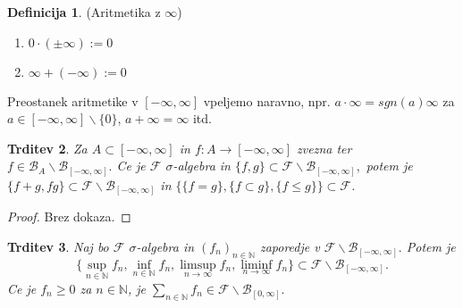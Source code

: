 \documentclass[a4paper,12pt]{article}
\theoremstyle{definition} %
\newtheorem{definicija}{Definicija}[section]
\theoremstyle{plain} %
\newtheorem{trditev}[definicija]{Trditev}
\newcommand{\N}{\mathbb{N}}
\newcommand{\F}{\mathcal{F}}
\begin{document}
            \begin{definicija} (Aritmetika z $\infty$)
                 \begin{enumerate}
                    \item $0\cdot (\pm\infty) := 0$
                    \item $\infty + (-\infty) := 0$
                 \end{enumerate}
                 Preostanek aritmetike v $[-\infty, \infty]$ vpeljemo naravno, npr. $a \cdot \infty = sgn(a)\infty$ za $a \in [-\infty, \infty]\backslash\{0\}$, $a + \infty = \infty$ itd.
            \end{definicija}

            \begin{trditev}
                Za $A \subset [-\infty, \infty]$ in $f:A \rightarrow [-\infty, \infty]$ zvezna ter $f \in \mathcal{B}_A\backslash\mathcal{B}_{[-\infty, \infty]}.$ Ce je $\F$ $\sigma$-algebra 
                in $\{f, g\} \subset \F\backslash\mathcal{B}_{[-\infty, \infty]},$ potem je $\{f+g, fg\} \subset \F\backslash\mathcal{B}_{[-\infty, \infty]}$ in $\{\{f=g\}, \{f\subset g\}, \{f \leq g\}\} \subset \F$.
            \end{trditev}

            \begin{proof}
                Brez dokaza.
            \end{proof}

            \begin{trditev}
                Naj bo $\F$ $\sigma$-algebra in $\left(f_n\right)_{n \in \N}$ zaporedje v $\F\backslash\mathcal{B}_{[-\infty, \infty]}.$
                Potem je $$\{\sup_{n \in \N}f_n, \inf_{n \in \N}f_n, \limsup_{n \rightarrow \infty}f_n, \liminf_{n \rightarrow \infty}f_n \} \subset \F\backslash\mathcal{B}_{[-\infty, \infty]}.$$
                Ce je $f_n \geq 0$ za $n \in \N$, je $\sum_{n \in \N}f_n \in \F\backslash\mathcal{B}_{[0, \infty]}.$
            \end{trditev}
\end{document}

